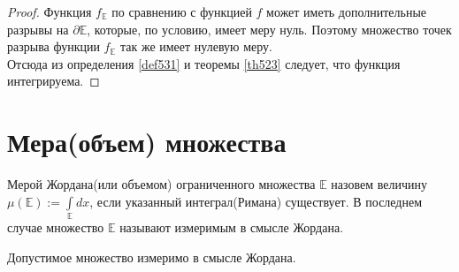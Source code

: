 \begin{proof}
  Функция $f_{\mathbb{E}}$ по сравнению с функцией $f$ может иметь
  дополнительные разрывы на $\partial \mathbb{E}$, которые, по условию, имеет
  меру нуль. Поэтому множество точек разрыва функции $f_{\mathbb{E}}$ так же
  имеет нулевую меру. \\
  Отсюда из определения \eqref{def531} и теоремы \eqref{th523} следует, что
  функция интегрируема.
\end{proof}

\section{Мера(объем) множества}
\begin{definition}
  Мерой Жордана(или объемом) ограниченного множества $\mathbb{E}$ назовем
  величину $\mu(\mathbb{E}) := \int\limits_{\mathbb{E}} dx$, если указанный
  интеграл(Римана) существует. В последнем случае множество $\mathbb{E}$
  называют измеримым в смысле Жордана.
\end{definition}

\begin{theorem}
  Допустимое множество измеримо в смысле Жордана.
\end{theorem}


